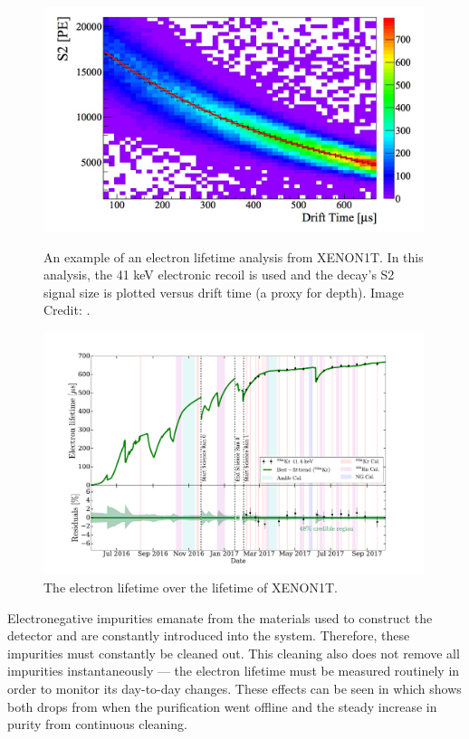 \begin{figure}[p]
	\centering
	\includegraphics[width=0.99\textwidth]{../../Chapter2/images/tpc_electron_lifetime.jpeg}
	\caption{An example of an electron lifetime analysis from XENON1T.  In this analysis, the 41 keV  electronic recoil is used and the decay's S2 signal size is plotted versus drift time (a proxy for depth).  Image Credit: .}
	\label{fig:xe1t_electron_lifetime}
	
	\centering
	\includegraphics[width=0.99\textwidth]{xe1t_electron_lifetime_full}
	\caption{The electron lifetime over the lifetime of XENON1T.}
	\label{fig:xe1t_electron_lifetime_sr0}
\end{figure}


Electronegative impurities emanate from the materials used to construct the detector and are constantly introduced into the system.  Therefore, these impurities must constantly be cleaned out.  This cleaning also does not remove all impurities instantaneously --- the electron lifetime must be measured routinely in order to monitor its day-to-day changes.  These effects can be seen in  which shows both drops from when the purification went offline and the steady increase in purity from continuous cleaning.


